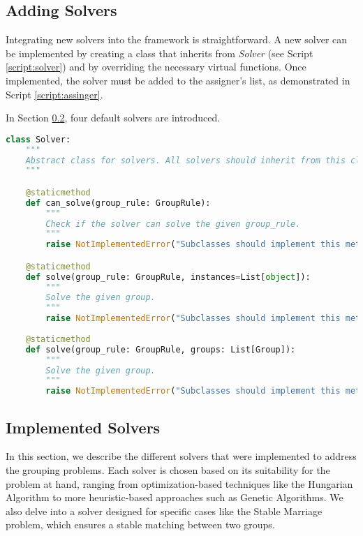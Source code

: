         \subsection{Adding Solvers}
            Integrating new solvers into the framework is straightforward.
            A new solver can be implemented by creating a class that inherits from \textit{Solver} (see Script \ref{script:solver}) and by overriding the necessary virtual functions.
            Once implemented, the solver must be added to the assigner's list, as demonstrated in Script \ref{script:assinger}.

            In Section \ref{sec:implemented_solvers}, four default solvers are introduced.

\begin{lstlisting}[language=Python, caption={Solver Class.}, label={script:solver}]
class Solver:
    """
    Abstract class for solvers. All solvers should inherit from this class.
    """

    @staticmethod
    def can_solve(group_rule: GroupRule):
        """
        Check if the solver can solve the given group_rule.
        """
        raise NotImplementedError("Subclasses should implement this method.")

    @staticmethod
    def solve(group_rule: GroupRule, instances=List[object]):
        """
        Solve the given group.
        """
        raise NotImplementedError("Subclasses should implement this method.")
    
    @staticmethod
    def solve(group_rule: GroupRule, groups: List[Group]):
        """
        Solve the given group.
        """
        raise NotImplementedError("Subclasses should implement this method.")
    \end{lstlisting}

    \subsection{Implemented Solvers}
    \label{sec:implemented_solvers}
    In this section, we describe the different solvers that were implemented to address the grouping problems. Each solver is chosen based on its suitability for the problem at hand, ranging from optimization-based techniques like the Hungarian Algorithm to more heuristic-based approaches such as Genetic Algorithms. We also delve into a solver designed for specific cases like the Stable Marriage problem, which ensures a stable matching between two groups.

